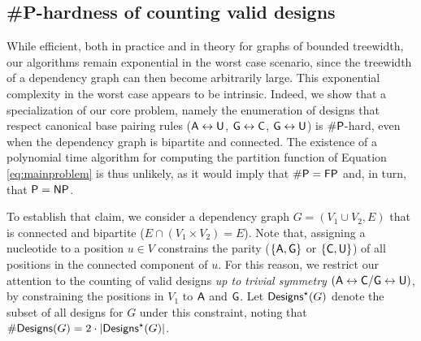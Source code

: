 \documentclass[]{bmcart}
\newcommand{\real}{\mathbb{R}}
\newcommand{\Def}[1]{\emph{#1}}
\newcommand{\Design}[1]{{\sf Designs}^{\star}(#1)}
\newcommand{\NumDesign}{\ensuremath{\#}{\sf Designs}\xspace}
\newcommand{\Nuc}[1]{{\sf #1}}
\newcommand{\Ab}{\Nuc{A}}
\newcommand{\Cb}{\Nuc{C}}
\newcommand{\Gb}{\Nuc{G}}
\newcommand{\Ub}{\Nuc{U}}
\newcommand{\citep}[1]{\cite{#1}}
\newcommand{\revised}[1]{{\color{red} #1}}
\begin{document}
\subsection*{\#{\sf P}-hardness of counting valid designs}\label{sec:counting}
\revised{While efficient, both in practice and in theory for graphs of bounded treewidth, our algorithms remain exponential in the worst case scenario, since the treewidth of a dependency graph can then become arbitrarily large. This exponential complexity in the worst case appears to be intrinsic. Indeed, we show that a specialization of our core problem, namely the enumeration of designs that respect canonical base pairing rules ($\Ab \leftrightarrow \Ub$, $\Gb \leftrightarrow \Cb$, $\Gb \leftrightarrow \Ub$) is $\#{\sf P}$-hard, even when the dependency graph is bipartite and connected. The existence of a polynomial time algorithm for computing the partition function of Equation \eqref{eq:mainproblem} is thus unlikely, as it would imply that  ${\sf\# P}={\sf FP}$ and, in turn, that ${\sf P}={\sf NP}$.}

%

To establish that claim, we consider a dependency graph $G=(V_1\cup V_2, E)$ that is connected and bipartite ($E \cap (V_1\times V_2) = E$). Note that, assigning a nucleotide to a position $u\in V$ constrains the parity ($\{\Ab,\Gb\}$ or $\{\Cb,\Ub\}$) of all positions in the connected component of $u$. For this reason, we restrict our attention to the counting of valid designs \emph{up to trivial  symmetry} $(\Ab\leftrightarrow \Cb/\Gb\leftrightarrow \Ub)$, by constraining the positions in $V_{1}$ to $\Ab$ and $\Gb$. Let $\Design{G}$ denote the subset of all designs for $G$ under this constraint, noting that $\NumDesign(G) = 2\cdot|\Design{G}|$.
\end{document}
